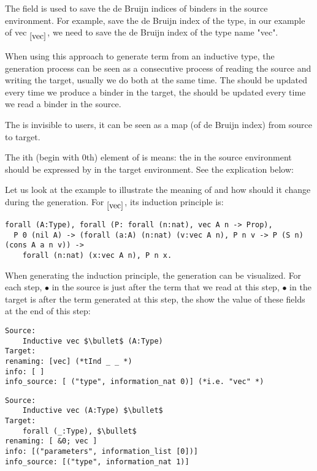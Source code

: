 \documentclass[a4paper,UKenglish,cleveref, autoref, thm-restate]{lipics-v2021}
\begin{document}
The field  is used to save the de Bruijn indices of binders in the source environment. For example, save the de Bruijn index of the type, in our example of vec $ _{\ref{vec}}$, we need to save the de Bruijn index of the type name "vec".

When using this approach to generate term from an inductive type, the generation process can be seen as a consecutive process of reading the source and writing the target, usually we do both at the same time. The  should be updated every time we produce a binder in the target, the  should be updated every time we read a binder in the source.

The  is invisible to users, it can be seen as a map (of de Bruijn index) from source to target. 

The ith (begin with $0$th) element of  is  means:
the  in the source environment should be expressed by  in the target environment. See the explication below:

Let us look at the example to illustrate the meaning of  and how should it change during the generation. For  $_{\ref{vec}}$, its induction principle is:


\begin{lstlisting}[language = {Coq}, basicstyle = \small]
forall (A:Type), forall (P: forall (n:nat), vec A n -> Prop),
  P 0 (nil A) -> (forall (a:A) (n:nat) (v:vec A n), P n v -> P (S n) (cons A a n v)) ->
    forall (n:nat) (x:vec A n), P n x.
\end{lstlisting}

When generating the induction principle, the generation can be visualized. For each step, $\bullet$ in the source is just after the term that we read at this step, $\bullet$ in the target is after the term generated at this step, the  show the value of these fields at the end of this step:
\begin{lstlisting}[language = {Coq}, basicstyle = \small]
Source:
    Inductive vec $\bullet$ (A:Type) 
Target:
renaming: [vec] (*tInd _ _ *)
info: [ ]
info_source: [ ("type", information_nat 0)] (*i.e. "vec" *)
\end{lstlisting}

\begin{lstlisting}[language = {Coq}, basicstyle = \small]
Source:
    Inductive vec (A:Type) $\bullet$
Target:
    forall (_:Type), $\bullet$
renaming: [ &0; vec ]
info: [("parameters", information_list [0])]
info_source: [("type", information_nat 1)]
\end{lstlisting}
\end{document}
